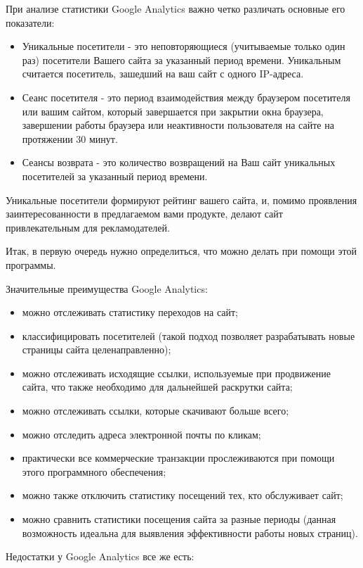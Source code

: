 \documentclass[a4paper,english,russian]{G2-105}
\begin{document}
\par При анализе статистики Google Analytics важно четко различать основные его показатели:
\begin{itemize}
\item Уникальные посетители - это неповторяющиеся (учитываемые только один раз) посетители Вашего сайта за указанный период времени. Уникальным считается посетитель, зашедший на ваш сайт с одного IP-адреса.
\item Сеанс посетителя - это период взаимодействия между браузером посетителя или вашим сайтом, который завершается при закрытии окна браузера, завершении работы браузера или неактивности пользователя на сайте на протяжении 30 минут.
\item Сеансы возврата - это количество возвращений на Ваш сайт уникальных посетителей за указанный период времени.
\end{itemize}
\par Уникальные посетители формируют рейтинг вашего сайта, и, помимо проявления заинтересованности в предлагаемом вами продукте, делают сайт привлекательным для рекламодателей.
\par Итак, в первую очередь нужно определиться, что можно делать при помощи этой программы.
\par Значительные преимущества Google Analytics:
\begin{itemize}
\item можно отслеживать статистику переходов на сайт;
\item классифицировать посетителей (такой подход позволяет разрабатывать новые страницы сайта целенаправленно);
\item можно отслеживать исходящие ссылки, используемые при продвижение сайта, что также необходимо для дальнейшей раскрутки сайта;
\item можно отслеживать ссылки, которые скачивают больше всего;
\item можно отследить адреса электронной почты по кликам;
\item практически все коммерческие транзакции прослеживаются при помощи этого программного обеспечения;
\item можно также отключить статистику посещений тех, кто обслуживает сайт;
\item можно сравнить статистики посещения сайта за разные периоды (данная возможность идеальна для выявления эффективности работы новых страниц).
\end{itemize}
\par Недостатки у Google Analytics все же есть:
\end{document}
